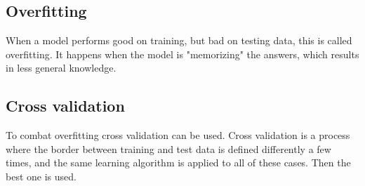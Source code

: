 \subsection{Overfitting}
\label{sec:overfit}
When a model performs good on training, but bad on testing data, this is called overfitting. It happens when the model is "memorizing" the answers, which results in less general knowledge.
\subsection{Cross validation}
To combat overfitting cross validation can be used. Cross validation is a process where the border between training and test data is defined differently a few times, and the same learning algorithm is applied to all of these cases. Then the best one is used.